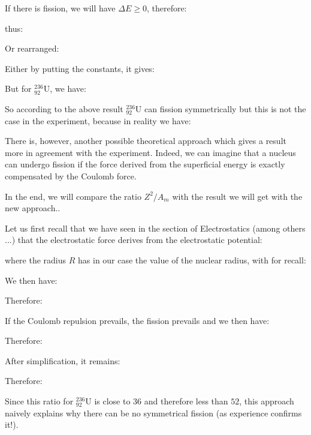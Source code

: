 	
	\begin{tcolorbox}[colframe=black,colback=white,sharp corners]
	If there is fission, we will have $\Delta E\ge 0$, therefore:
	
	thus:
	
	Or rearranged:
	
	Either by putting the constants, it gives:
	
	But for $_{92}^{236}\mathrm{U}$, we have:
	
	So according to the above result $_{92}^{236}\mathrm{U}$ can fission symmetrically but this is not the case in the experiment, because in reality we have:
	
	\end{tcolorbox}
	There is, however, another possible theoretical approach which gives a result more in agreement with the experiment. Indeed, we can imagine that a nucleus can undergo fission if the force derived from the superficial energy is exactly compensated by the Coulomb force.

	In the end, we will compare the ratio $Z^2/A_m$ with the result we will get with the new approach..

	Let us first recall that we have seen in the section of Electrostatics (among others ...) that the electrostatic force derives from the electrostatic potential:
	
	where the radius $R$ has in our case the value of the nuclear radius, with for recall:
	
	We then have:
	
	Therefore:
	
	If the Coulomb repulsion prevails, the fission prevails and we then have:
	
	Therefore:
	
	After simplification, it remains:
	
	Therefore:
	
	Since this ratio for $_{92}^{236}\mathrm{U}$ is close to $36$ and therefore less than $52$, this approach naively explains why there can be no symmetrical fission (as experience confirms it!).
	
